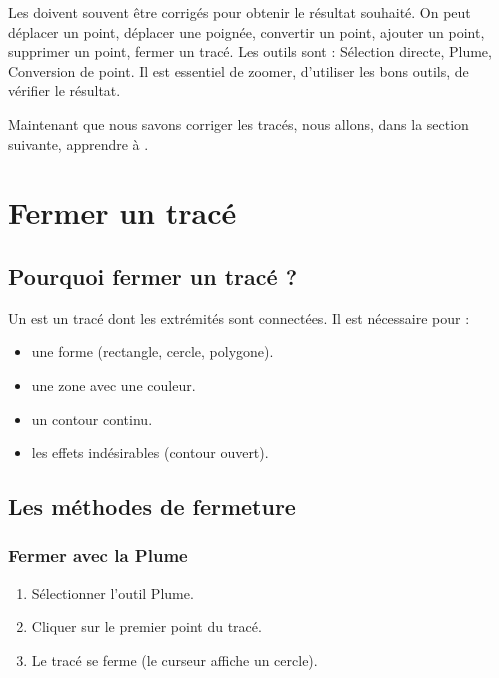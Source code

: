Les  doivent souvent être corrigés pour obtenir le résultat souhaité. On peut déplacer un point, déplacer une poignée, convertir un point, ajouter un point, supprimer un point, fermer un tracé. Les outils sont : Sélection directe, Plume, Conversion de point. Il est essentiel de zoomer, d'utiliser les bons outils, de vérifier le résultat.

Maintenant que nous savons corriger les tracés, nous allons, dans la section suivante, apprendre à .

\section{Fermer un tracé}

\subsection{Pourquoi fermer un tracé ?}

Un  est un tracé dont les extrémités sont connectées. Il est nécessaire pour :

\begin{itemize}
    \item {} une forme (rectangle, cercle, polygone).
    \item {} une zone avec une couleur.
    \item {} un contour continu.
    \item {} les effets indésirables (contour ouvert).
\end{itemize}

\subsection{Les méthodes de fermeture}

\subsubsection{Fermer avec la Plume}

\begin{enumerate}
    \item Sélectionner l'outil Plume.
    \item Cliquer sur le premier point du tracé.
    \item Le tracé se ferme (le curseur affiche un cercle).
\end{enumerate}

